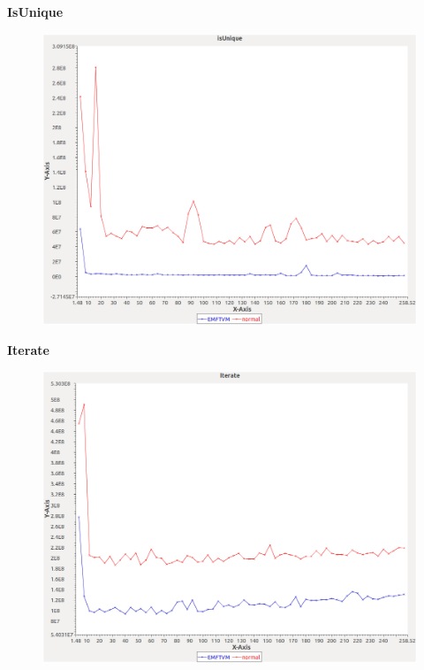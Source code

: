 \noindent\textbf{IsUnique}

\begin{figure}[h]
\centering
\includegraphics[width=\textwidth]{../graphs/set/isUnique}
\end{figure}
\pagebreak

\noindent\textbf{Iterate}

\begin{figure}[h]
\centering
\includegraphics[width=\textwidth]{../graphs/set/Iterate}
\end{figure}
\pagebreak

